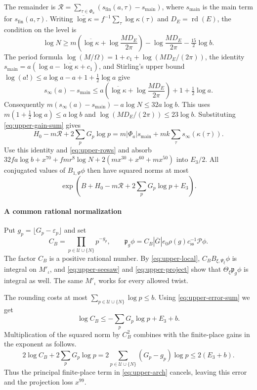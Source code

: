 The remainder is
\(\mathcal R=\sum_{\tau\in\Phi_a}(s_{\mathrm{fin}}(a,\tau)-s_{\mathrm{main}})\),
where \(s_{\mathrm{main}}\) is the main term for \(s_{\mathrm{fin}}(a,\tau)\).
Writing \(\overline{\log\kappa}=f^{-1}\sum_\tau\log\kappa(\tau)\) and
\(D_E=\operatorname{rd}(E)\), the condition on the level is
\[
 \log N\ge m\!\left(\overline{\log\kappa}
                 +\log \frac{M D_E}{2\pi}\right)
          -\log\frac{M D_E}{2\pi}-\tfrac{15}2\log b.
\]
The period formula
\(\log(M/\Omega)=1+c_1+\log(M D_E/(2\pi))\),
the identity \(s_{\mathrm{main}}=a(\log a-\overline{\log\kappa}+c_1)\),
and Stirling's upper bound
\(\log(a!)\le a\log a-a+1+\frac12\log a\) give
\[
 s_\infty(a)-s_{\mathrm{main}}
 \le a\!\left(\overline{\log\kappa}+\log \frac{M D_E}{2\pi}\right)
        +1+\tfrac12\log a .
\]
Consequently \(m(s_\infty(a)-s_{\mathrm{main}})-a\log N\le32a\log b\).
This uses \(m(1+\frac12\log a)\le a\log b\) and
\(\log(M D_E/(2\pi))\le23\log b\).
Substituting \eqref{eq:upper-gain-sum} gives
\[
 H_0-m\mathcal R+2\sum_p G_p\log p
 =m|\Phi_a|s_{\mathrm{main}}+mk\sum_\tau s_\infty(\kappa(\tau)).
\]
Use this identity and \eqref{eq:upper-rows} and absorb
\(32fa\log b+x^{70}+fmr^8\log N+
  2(mx^{30}+x^{60}+mx^{50})\) into \(E_3/2\).
All conjugated values of \(B_{1,\Psi}\phi\) then have squared norms at most
\begin{equation}\label{eq:upper-arch}
  \exp\!\left(B+H_0-m\mathcal R+2\sum_p G_p\log p+E_3\right).
\end{equation}

\paragraph{A common rational normalization}
Put \(g_p=\lfloor G_p-\varepsilon_p\rfloor\) and set
\[
 C_B=\prod_{p\in\mathcal U\cup\{N\}}p^{-g_p},\qquad
 \mathfrak p_g\phi
   = C_B|\overline G|e_0\rho(g)c_{\mathrm{ss}}^{-1}\mathcal P\phi .
\]
The factor \(C_B\) is a positive rational number.
By \eqref{eq:upper-local}, \(C_B B_{\xi,\Psi_\xi}\phi\) is integral on
\(M'_\iota\), and \eqref{eq:upper-seesaw} and \eqref{eq:upper-project}
show that \(\Theta_\xi\mathfrak p_g\phi\) is integral as well.
The same \(M'_\iota\) works for every allowed twist.

The rounding costs at most \(\sum_{p\in\mathcal U\cup\{N\}}\log p\le b\).
Using \eqref{eq:upper-error-sum} we get
\begin{equation}\label{eq:upper-cb}
 \log C_B\le-\sum_p G_p\log p+E_3+b .
\end{equation}
Multiplication of the squared norm by \(C_B^2\) combines with the
finite-place gains in the exponent as follows.
\[
 2\log C_B+2\sum_p G_p\log p
    =2\sum_{p\in\mathcal U\cup\{N\}}(G_p-g_p)\log p
    \le 2(E_3+b).
\]
Thus the principal finite-place term in \eqref{eq:upper-arch} cancels,
leaving this error and the projection loss \(x^{99}\).

